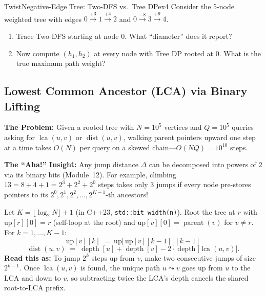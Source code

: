 \documentclass[11pt,a4paper]{article}
\theoremstyle{definition}
\newcommand{\painbeat}{\textbf{\color{accentamber}The Problem:} }
\newcommand{\ahabeat}{\textbf{\color{accentteal}The ``Aha!'' Insight:} }
\begin{document}
\begin{tryitbox}{Twist}{Negative-Edge Tree: Two-DFS vs.\ Tree DP}{ex4}
Consider the 5-node weighted tree with edges $0 \xrightarrow{+3} 1 \xrightarrow{+4} 2$ and $0 \xrightarrow{-8} 3 \xrightarrow{+9} 4$.
\begin{enumerate}[itemsep=2pt, topsep=2pt]
    \item Trace Two-DFS starting at node $0$. What ``diameter'' does it report?
    \item Now compute $(h_1, h_2)$ at every node with Tree DP rooted at $0$. What is the true maximum path weight?
\end{enumerate}
\end{tryitbox}

\subsection{Lowest Common Ancestor (LCA) via Binary Lifting}

\painbeat Given a rooted tree with $N = 10^5$ vertices and $Q = 10^5$ queries asking for $\operatorname{lca}(u, v)$ or $\operatorname{dist}(u, v)$, walking parent pointers upward one step at a time takes $O(N)$ per query on a skewed chain---$O(NQ) = 10^{10}$ steps.

\ahabeat Any jump distance $\Delta$ can be decomposed into powers of $2$ via its binary bits (Module~12). For example, climbing $13 = 8 + 4 + 1 = 2^3 + 2^2 + 2^0$ steps takes only $3$ jumps if every node pre-stores pointers to its $2^0, 2^1, 2^2, \dots, 2^{K-1}$-th ancestors!

\begin{formulabox}
Let $K = \lfloor \log_2 N \rfloor + 1$ (in C++23, \texttt{std::bit\_width(n)}). Root the tree at $r$ with $\text{up}[r][0] = r$ (self-loop at the root) and $\text{up}[v][0] = \operatorname{parent}(v)$ for $v \ne r$. For $k = 1, \dots, K - 1$:
$$\text{up}[v][k] \;=\; \text{up}\!\bigl[\,\text{up}[v][k - 1]\,\bigr][k - 1]$$
$$\operatorname{dist}(u, v) \;=\; \operatorname{depth}[u] + \operatorname{depth}[v] - 2 \cdot \operatorname{depth}\!\bigl[\operatorname{lca}(u, v)\bigr].$$
\textbf{Read this as:} To jump $2^k$ steps up from $v$, make two consecutive jumps of size $2^{k-1}$. Once $\operatorname{lca}(u, v)$ is found, the unique path $u \leadsto v$ goes up from $u$ to the LCA and down to $v$, so subtracting twice the LCA's depth cancels the shared root-to-LCA prefix.
\end{formulabox}
\end{document}
